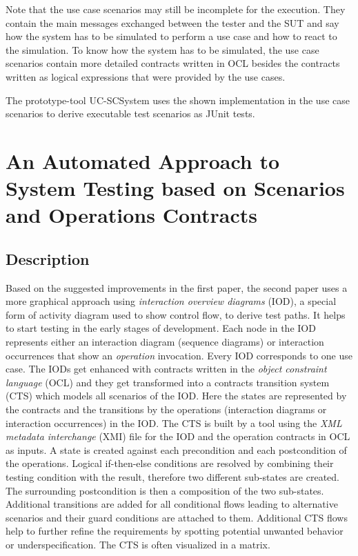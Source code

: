 Note that the use case scenarios may still be incomplete for the execution. They contain the main messages exchanged between the tester and the SUT and say how the system has to be simulated to perform a use case and how to react to the simulation. To know how the system has to be simulated, the use case scenarios contain more detailed contracts written in OCL besides the contracts written as logical expressions that were provided by the use cases. 

The prototype-tool UC-SCSystem uses the shown implementation in the use case scenarios to derive executable test scenarios as JUnit tests.

\section{An Automated Approach to System Testing based on Scenarios and Operations Contracts} \label{approachtwo}

\subsection{Description}

Based on the suggested improvements in the first paper, the second paper uses a more graphical approach using \textit{interaction overview diagrams} (IOD), a special form of activity diagram used to show control flow, to derive test paths. It helps to start testing in the early stages of development. Each node in the IOD represents either an interaction diagram (sequence diagrams) or interaction occurrences that show an \textit{operation} invocation. Every IOD corresponds to one use case. The IODs get enhanced with contracts written in the \textit{object constraint language} (OCL) and they get transformed into a contracts transition system (CTS) which models all scenarios of the IOD. Here the states are represented by the contracts and the transitions by the operations (interaction diagrams or interaction occurrences) in the IOD. The CTS is built by a tool using the \textit{XML metadata interchange} (XMI) file for the IOD and the operation contracts in OCL as inputs. A state is created against each precondition and each postcondition of the operations. Logical if-then-else conditions are resolved by combining their testing condition with the result, therefore two different sub-states are created. The surrounding postcondition is then a composition of the two sub-states. Additional transitions are added for all conditional flows leading to alternative scenarios and their guard conditions are attached to them. Additional CTS flows help to further refine the requirements by spotting potential unwanted behavior or underspecification. The CTS is often visualized in a matrix. 

